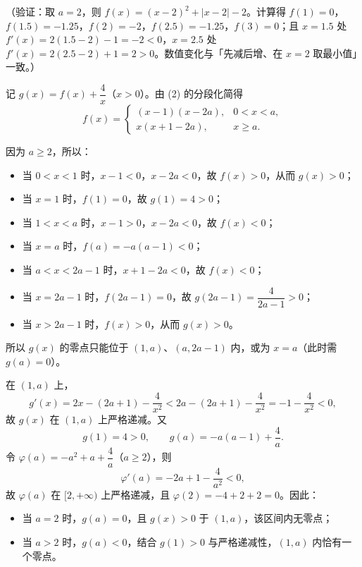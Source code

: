 \begin{answer}
（验证：取 \(a=2\)，则 \(f(x)=(x-2)^2+|x-2|-2\)。计算得 \(f(1)=0\)，\(f(1.5)=-1.25\)，\(f(2)=-2\)，\(f(2.5)=-1.25\)，\(f(3)=0\)；且 \(x=1.5\) 处 \(f'(x)=2(1.5-2)-1=-2<0\)，\(x=2.5\) 处 \(f'(x)=2(2.5-2)+1=2>0\)。数值变化与「先减后增、在 \(x=2\) 取最小值」一致。）


记 \(g(x)=f(x)+\dfrac4x\)（\(x>0\)）。由 (2) 的分段化简得
\nopagebreak[4]
\[
f(x)=
\begin{cases}
(x-1)(x-2a), & 0<x<a,\\[2pt]
x(x+1-2a), & x\geqslant a.
\end{cases}
\]

因为 \(a\geqslant2\)，所以：

\begin{itemize}
\item 当 \(0<x<1\) 时，\(x-1<0\)，\(x-2a<0\)，故 \(f(x)>0\)，从而 \(g(x)>0\)；
\item 当 \(x=1\) 时，\(f(1)=0\)，故 \(g(1)=4>0\)；
\item 当 \(1<x<a\) 时，\(x-1>0\)，\(x-2a<0\)，故 \(f(x)<0\)；
\item 当 \(x=a\) 时，\(f(a)=-a(a-1)<0\)；
\item 当 \(a<x<2a-1\) 时，\(x+1-2a<0\)，故 \(f(x)<0\)；
\item 当 \(x=2a-1\) 时，\(f(2a-1)=0\)，故 \(g(2a-1)=\dfrac4{2a-1}>0\)；
\item 当 \(x>2a-1\) 时，\(f(x)>0\)，从而 \(g(x)>0\)。
\end{itemize}

所以 \(g(x)\) 的零点只能位于 \((1,a)\)、\((a,2a-1)\) 内，或为 \(x=a\)（此时需 \(g(a)=0\)）。

在 \((1,a)\) 上，
\nopagebreak[4]
\[
g'(x)=2x-(2a+1)-\dfrac4{x^2}<2a-(2a+1)-\dfrac4{x^2}=-1-\dfrac4{x^2}<0,
\]
故 \(g(x)\) 在 \((1,a)\) 上严格递减。又
\nopagebreak[4]
\[
g(1)=4>0,\qquad g(a)=-a(a-1)+\dfrac4a.
\]
令 \(\varphi(a)=-a^2+a+\dfrac4a\)（\(a\geqslant2\)），则
\nopagebreak[4]
\[
\varphi'(a)=-2a+1-\dfrac4{a^2}<0,
\]
故 \(\varphi(a)\) 在 \([2,+\infty)\) 上严格递减，且 \(\varphi(2)=-4+2+2=0\)。因此：

\begin{itemize}
\item 当 \(a=2\) 时，\(g(a)=0\)，且 \(g(x)>0\) 于 \((1,a)\)，该区间内无零点；
\item 当 \(a>2\) 时，\(g(a)<0\)，结合 \(g(1)>0\) 与严格递减性，\((1,a)\) 内恰有一个零点。
\end{itemize}


\end{answer}
